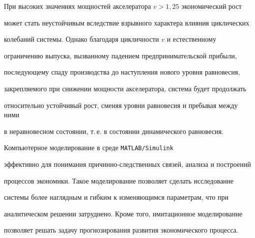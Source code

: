 При высоких значениях мощностей акселератора $v >1,25$ экономический рост 

может стать неустойчивым вследствие взрывного характера влияния циклических 

колебаний системы. Однако благодаря цикличности $v $ и естественному 

ограничению выпуска, вызванному падением предпринимательской прибыли, 

последующему спаду производства до наступления нового уровня равновесия, 

закрепляемого при снижении мощности акселератора, система будет продолжать 

относительно устойчивый рост, сменяя уровни равновесия и пребывая между ними 

в неравновесном состоянии, т.\,е. в состоянии динамического равновесия.



Компьютерное моделирование в среде {\tt MATLAB/Simu\-link} 

эффективно для понимания причинно-следственных связей, анализа и построений 

процессов экономики. Такое моделирование позволяет сделать исследование 

системы более наглядным и гибким к изменяющимся параметрам, что при 

аналитическом решении затруднено. Кроме того, имитационное моделирование 

позволяет решать задачу прогнозирования развития экономического процесса. 



